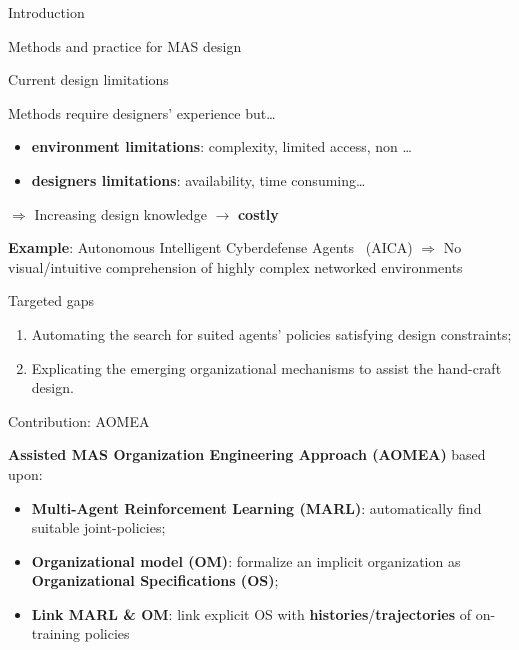 \begin{frame}[allowframebreaks]{Introduction}
\begin{block}{Methods and practice for MAS design}
    \end{block}

    \begin{alertblock}{Current design limitations}

        Methods require designers' experience but\dots

        \begin{itemize}
            \item \textbf{environment limitations}: complexity, limited access, non \dots
            \item \textbf{designers limitations}: availability, time consuming\dots
        \end{itemize}
        \vspace{1ex}
        $\Longrightarrow$ Increasing design knowledge $\rightarrow$ \textbf{costly}
    \end{alertblock}

    \begin{exampleblock}{\textbf{Example}: Autonomous Intelligent Cyberdefense Agents~\cite{Kott2023} (AICA)}
        $\Longrightarrow$ No visual/intuitive comprehension of highly complex networked environments
    \end{exampleblock}

    \begin{alertblock}{Targeted gaps}
        \begin{enumerate}
            \item Automating the search for suited agents' policies satisfying design constraints;
            \item Explicating the emerging organizational mechanisms to assist the hand-craft design.
        \end{enumerate}
    \end{alertblock}

    \begin{prosblock}{Contribution: AOMEA}

        \textbf{Assisted MAS Organization Engineering Approach (AOMEA)} based upon:
        \begin{itemize}
            \item \textbf{Multi-Agent Reinforcement Learning (MARL)}: automatically find suitable joint-policies;
            \item \textbf{Organizational model (OM)}: formalize an implicit organization as \textbf{Organizational Specifications (OS)};
            \item \textbf{Link MARL \& OM}: link explicit OS with \textbf{histories}/\textbf{trajectories} of on-training policies
        \end{itemize}


\end{prosblock}
\end{frame}
